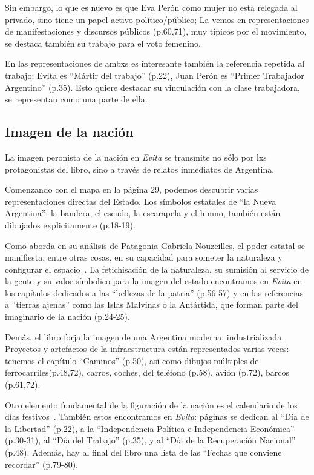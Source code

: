 Sin embargo, lo que es nuevo es que Eva Perón como mujer no esta relegada al privado, sino tiene un papel activo político/público;
La vemos en representaciones de manifestaciones y discursos públicos (p.60,71), muy típicos por el movimiento, se destaca también su trabajo para el voto femenino.

En las representaciones de ambxs es interesante también la referencia repetida al trabajo:
Evita es ``Mártir del trabajo'' (p.22),
Juan Perón es ``Primer Trabajador Argentino'' (p.35).
Esto quiere destacar su vinculación con la clase trabajadora, se representan como una parte de ella.


\subsection{Imagen de la nación}

La imagen peronista de la nación en \textit{Evita} se transmite no sólo por lxs protagonistas del libro, sino a través de relatos inmediatos de Argentina.

Comenzando con el mapa en la página 29, podemos descubrir varias representaciones directas del Estado.
Los símbolos estatales de ``la Nueva Argentina'': la bandera, el escudo, la escarapela y el himno, también están dibujados explicitamente (p.18-19).

Como aborda en su análisis de Patagonia Gabriela Nouzeilles, el poder estatal se manifiesta, entre otras cosas, en su capacidad para someter la naturaleza y configurar el espacio~\autocite{Nou1999}.
La fetichisación de la naturaleza, su sumisión al servicio de la gente y su valor símbolico para la imagen del estado encontramos en \textit{Evita} en los capítulos dedicados a las ``bellezas de la patria'' (p.56-57) y en las referencias a ``tierras ajenas'' como las Islas Malvinas o la Antártida, que forman parte del imaginario de la nación (p.24-25).

Demás, el libro forja la imagen de una Argentina moderna, industrializada.
Proyectos y artefactos de la infraestructura están representados varias veces:
tenemos el capítulo ``Caminos'' (p.50), así como dibujos múltiples de ferrocarriles(p.48,72), carros, coches, del teléfono (p.58), avión (p.72), barcos (p.61,72).

Otro elemento fundamental de la figuración de la nación es el calendario de los días festivos~\autocite{SzIr2009}.
También estos encontramos en \textit{Evita}:
páginas se dedican al
``Día de la Libertad'' (p.22),
a la ``Independencia Política e Independencia Económica'' (p.30-31),
al ``Día del Trabajo'' (p.35),
y al ``Día de la Recuperación Nacional'' (p.48).
Además, hay al final del libro una lista de las ``Fechas que conviene recordar'' (p.79-80).


